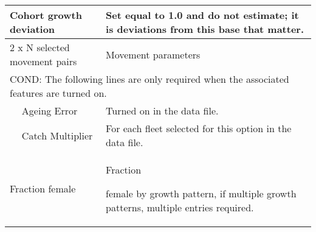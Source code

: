 \begin{longtable}{p{1cm} p{2.5cm} p{10cm}}
	\multicolumn{2}{l}{Cohort growth deviation} \Tstrut & Set equal to 1.0 and do not estimate; it is deviations from this base that matter.\Bstrut\\
	\hline

	\multicolumn{2}{l}{2 x N selected movement pairs} & Movement parameters\Tstrut\Bstrut\\
	\hline

	\multicolumn{3}{l}{COND: The following lines are only required when the associated features are turned on.}\Tstrut\\
	& Ageing Error & Turned on in the data file.\\
	& Catch Multiplier & For each fleet selected for this option in the data file.\\
	\hline

	\multicolumn{2}{l}{Fraction female}\Tstrut & \hypertarget{SexRatio}{Fraction} female by growth pattern, if multiple growth patterns, multiple entries required.\Bstrut\\
	\hline
\end{longtable}


